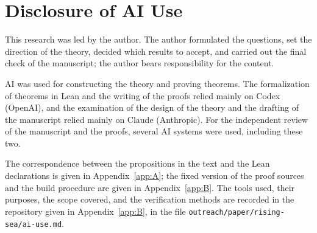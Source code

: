 \chapter{Disclosure of AI Use}\label{app:C}

This research was led by the author. The author formulated the questions, set the
direction of the theory, decided which results to accept, and carried out the final
check of the manuscript; the author bears responsibility for the content.

AI was used for constructing the theory and proving theorems. The formalization of
theorems in Lean and the writing of the proofs relied mainly on Codex (OpenAI), and
the examination of the design of the theory and the drafting of the manuscript relied
mainly on Claude (Anthropic). For the independent review of the
manuscript and the proofs, several AI systems were used, including these two.

The correspondence between the propositions in the text and the Lean declarations is
given in Appendix~\ref{app:A}; the fixed version of the proof sources and the build
procedure are given in Appendix~\ref{app:B}.
The tools used, their purposes, the scope covered, and the verification methods are
recorded in the repository given in Appendix~\ref{app:B}, in the file
\texttt{outreach/\allowbreak{}paper/\allowbreak{}rising-sea/\allowbreak{}ai-use.md}.
